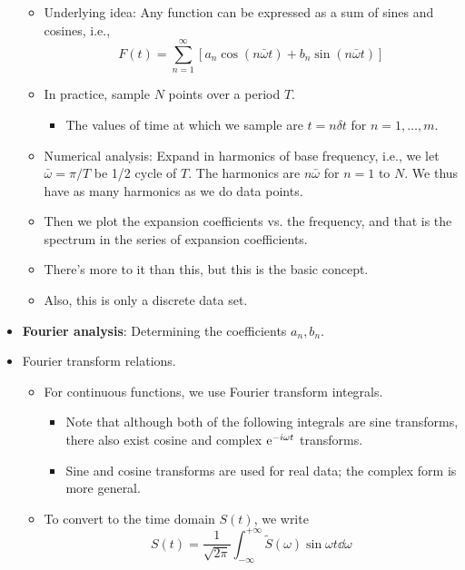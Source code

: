 \documentclass[../notes.tex]{subfiles}
\begin{document}
\begin{itemize}
    \begin{itemize}
        \item Underlying idea: Any function can be expressed as a sum of sines and cosines, i.e.,
        \begin{equation*}
            F(t) = \sum_{n=1}^\infty[a_n\cos(n\bar{\omega}t)+b_n\sin(n\bar{\omega}t)]
        \end{equation*}
        \item In practice, sample $N$ points over a period $T$.
        \begin{itemize}
            \item The values of time at which we sample are $t=n\delta t$ for $n=1,\dots,m$.
        \end{itemize}
        \item Numerical analysis: Expand in harmonics of base frequency, i.e., we let $\bar{\omega}=\pi/T$ be 1/2 cycle of $T$. The harmonics are $n\bar{\omega}$ for $n=1$ to $N$. We thus have as many harmonics as we do data points.
        \item Then we plot the expansion coefficients vs. the frequency, and that is the spectrum in the series of expansion coefficients.
        \item There's more to it than this, but this is the basic concept.
        \item Also, this is only a discrete data set.
    \end{itemize}
    \item \textbf{Fourier analysis}: Determining the coefficients $a_n,b_n$.
    \item Fourier transform relations.
    \begin{itemize}
        \item For continuous functions, we use Fourier transform integrals.
        \begin{itemize}
            \item Note that although both of the following integrals are sine transforms, there also exist cosine and complex $\e[-i\omega t]$ transforms.
            \item Sine and cosine transforms are used for real data; the complex form is more general.
        \end{itemize}
        \item To convert to the time domain $S(t)$, we write
        \begin{equation*}
            S(t) = \frac{1}{\sqrt{2\pi}}\int_{-\infty}^{+\infty}\tilde{S}(\omega)\sin\omega t\dd\omega

\end{equation*}
\end{itemize}
\end{itemize}
\end{document}
